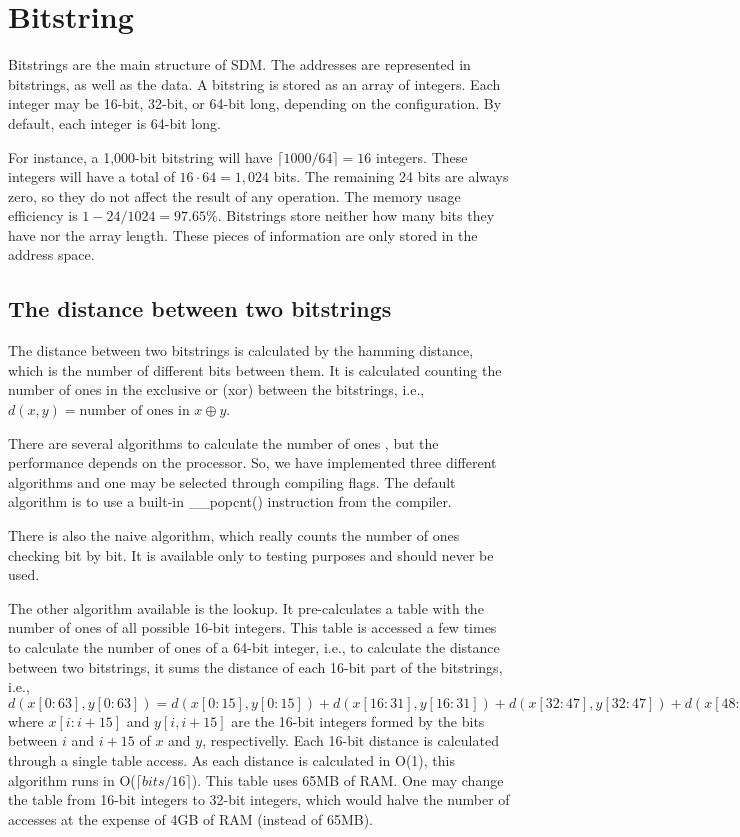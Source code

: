 \section{Bitstring}

Bitstrings are the main structure of SDM. The addresses are represented in bitstrings, as well as the data. A bitstring is stored as an array of integers. Each integer may be 16-bit, 32-bit, or 64-bit long, depending on the configuration. By default, each integer is 64-bit long.

For instance, a 1,000-bit bitstring will have $\lceil 1000/64 \rceil = 16$ integers. These integers will have a total of $16 \cdot 64 = 1,024$ bits. The remaining 24 bits are always zero, so they do not affect the result of any operation. The memory usage efficiency is $1 - 24/1024 = 97.65\%$. Bitstrings store neither how many bits they have nor the array length. These pieces of information are only stored in the address space.


\subsection{The distance between two bitstrings}

The distance between two bitstrings is calculated by the hamming distance, which is the number of different bits between them. It is calculated counting the number of ones in the exclusive or (xor) between the bitstrings, i.e., $d(x, y) = \text{number of ones in } x \oplus y$.

There are several algorithms to calculate the number of ones \citep{warren2013hacker}, but the performance depends on the processor. So, we have implemented three different algorithms and one may be selected through compiling flags. The default algorithm is to use a built-in \_\_popcnt() instruction from the compiler.

There is also the naive algorithm, which really counts the number of ones checking bit by bit. It is available only to testing purposes and should never be used.

The other algorithm available is the lookup. It pre-calculates a table with the number of ones of all possible 16-bit integers. This table is accessed a few times to calculate the number of ones of a 64-bit integer, i.e., to calculate the distance between two bitstrings, it sums the distance of each 16-bit part of the bitstrings, i.e., $d(x[0:63], y[0:63]) = d(x[0:15], y[0:15]) + d(x[16:31], y[16:31]) + d(x[32:47], y[32:47]) + d(x[48:63], y[48:63])$ where $x[i:i+15]$ and $y[i, i+15]$ are the 16-bit integers formed by the bits between $i$ and $i+15$ of $x$ and $y$, respectivelly. Each 16-bit distance is calculated through a single table access. As each distance is calculated in O(1), this algorithm runs in O($\lceil bits/16 \rceil$). This table uses 65MB of RAM. One may change the table from 16-bit integers to 32-bit integers, which would halve the number of accesses at the expense of 4GB of RAM (instead of 65MB).


